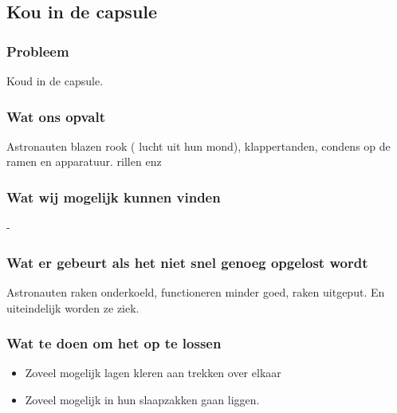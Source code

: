\subsection{Kou in de capsule}

\subsubsection{Probleem}
Koud in de capsule.

\subsubsection{Wat ons opvalt}
Astronauten blazen rook ( lucht uit hun mond), klappertanden, condens op de ramen en apparatuur. rillen enz

\subsubsection{Wat wij mogelijk kunnen vinden}
-

\subsubsection{Wat er gebeurt als het niet snel genoeg opgelost wordt}
Astronauten raken onderkoeld, functioneren minder goed, raken uitgeput. En uiteindelijk worden ze ziek.

\subsubsection{Wat te doen om het op te lossen}
\begin{itemize}
    \item Zoveel mogelijk lagen kleren aan trekken over elkaar
    \item Zoveel mogelijk in hun slaapzakken gaan liggen.
\end{itemize}
